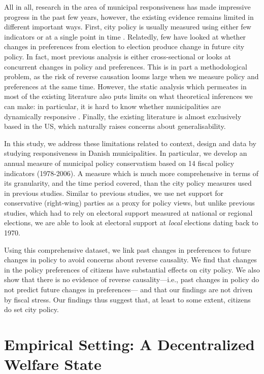 \documentclass[a4paper,12pt]{article}
\begin{document}
All in all, research in the area of municipal responsiveness has made impressive progress in the past few years, however, the existing evidence remains limited in different important ways. First, city policy is usually measured using either few indicators \citep{sances2017voters,einstein2016pushing} or at a single point in time \citep{tausanovitch2014representation}. Relatedly, few have looked at whether changes in preferences from election to election produce change in future city policy. In fact, most previous analysis is either cross-sectional or looks at concurrent changes in policy and preferences. This is in part a methodological problem, as the risk of reverse causation looms large when we measure policy and preferences at the same time. However, the static analysis which permeates in most of the existing literature also puts limits on what theoretical inferences we can make: in particular, it is hard to know whether municipalities are dynamically responsive \citep{stimson1995dynamic}. Finally, the existing literature is almost exclusively based in the US, which naturally raises concerns about generalisability.


In this study, we address these limitations related to context, design and data by studying responsiveness in Danish municipalities. In particular, we develop an annual measure of municipal policy conservatism based on 14 fiscal policy indicators (1978-2006). A measure which is much more comprehensive in terms of its granularity, and the time period covered, than the city policy measures used in previous studies. Similar to previous studies, we use net support for conservative (right-wing) parties as a proxy for policy views, but unlike previous studies, which had to rely on electoral support measured at national or regional elections, we are able to look at electoral support at \textit{local} elections dating back to 1970. 

Using this comprehensive dataset, we link past changes in preferences to future changes in policy to avoid concerns about reverse causality. We find that changes in the policy preferences of citizens have substantial effects on city policy. We also show that there is no evidence of reverse causality---i.e., past changes in policy do not predict future changes in preferences--- and that our findings are not driven by  fiscal stress. Our findings thus suggest that, at least to some extent, citizens do set city policy.


\section*{Empirical Setting: A Decentralized Welfare State}
\end{document}
